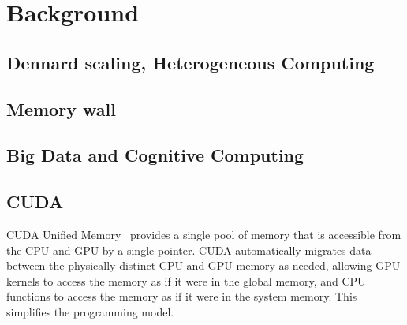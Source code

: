 \chapter{Background}


\section{Dennard scaling, Heterogeneous Computing}

\section{Memory wall}

\section{Big Data and Cognitive Computing}

\section{CUDA}

CUDA Unified Memory~\cite{harris2013cudaunifiedmemory} provides a single pool of memory that is accessible from the CPU and GPU by a single pointer.
CUDA automatically migrates data between the physically distinct CPU and GPU memory as needed, allowing GPU kernels to access the memory as if it were in the global memory, and CPU functions to access the memory as if it were in the system memory.
This simplifies the programming model.